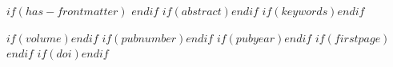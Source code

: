 $if(has-frontmatter)$
\frontmatter
$endif$
$if(abstract)$$endif$
$if(keywords)$$endif$
\maketitle
$if(volume)$$endif$
$if(pubnumber)$$endif$
$if(pubyear)$$endif$
$if(firstpage)$$endif$
$if(doi)$$endif$
